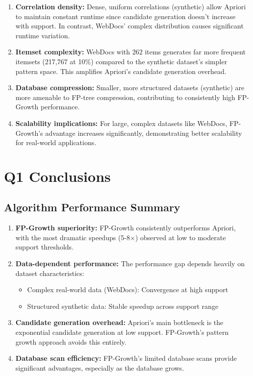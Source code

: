 \documentclass[11pt]{article}
\begin{document}
\begin{enumerate}
    \item \textbf{Correlation density:} Dense, uniform correlations (synthetic) allow Apriori to maintain constant runtime since candidate generation doesn't increase with support. In contrast, WebDocs' complex distribution causes significant runtime variation.
    
    \item \textbf{Itemset complexity:} WebDocs with 262 items generates far more frequent itemsets (217,767 at 10\%) compared to the synthetic dataset's simpler pattern space. This amplifies Apriori's candidate generation overhead.
    
    \item \textbf{Database compression:} Smaller, more structured datasets (synthetic) are more amenable to FP-tree compression, contributing to consistently high FP-Growth performance.
    
    \item \textbf{Scalability implications:} For large, complex datasets like WebDocs, FP-Growth's advantage increases significantly, demonstrating better scalability for real-world applications.
\end{enumerate}

\section{Q1 Conclusions}

\subsection{Algorithm Performance Summary}

\begin{enumerate}
    \item \textbf{FP-Growth superiority:} FP-Growth consistently outperforms Apriori, with the most dramatic speedups (5-8$\times$) observed at low to moderate support thresholds.
    
    \item \textbf{Data-dependent performance:} The performance gap depends heavily on dataset characteristics:
    \begin{itemize}
        \item Complex real-world data (WebDocs): Convergence at high support
        \item Structured synthetic data: Stable speedup across support range
    \end{itemize}
    
    \item \textbf{Candidate generation overhead:} Apriori's main bottleneck is the exponential candidate generation at low support. FP-Growth's pattern growth approach avoids this entirely.
    
    \item \textbf{Database scan efficiency:} FP-Growth's limited database scans provide significant advantages, especially as the database grows.
\end{enumerate}
\end{document}
